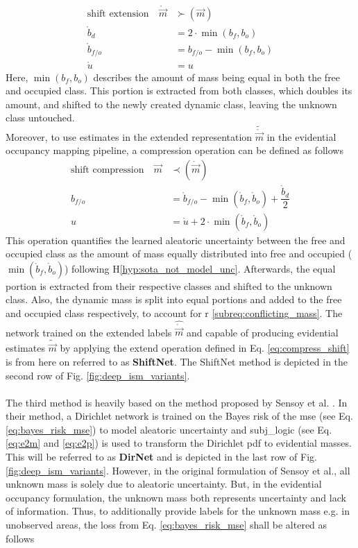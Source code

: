 \begin{align}
	\label{eq:extend_shift}
	\text{shift extension} \quad\mathring{\vec{m}} &\succ(\vec{m})\\
	\mathring{b}_d &= 2\cdot \min(b_f,b_o)\\
	\mathring{b}_{f/o} &= b_{f/o} - \min(b_f,b_o)\\
	\mathring{u} &= u
\end{align}
Here, $\min(b_f,b_o)$ describes the amount of mass being equal in both the free and occupied class. This portion is extracted from both classes, which doubles its amount, and shifted to the newly created dynamic class, leaving the unknown class untouched.\\ 
Moreover, to use estimates in the extended representation $\tilde{\mathring{\vec{m}}}$ in the evidential occupancy mapping pipeline, a compression operation can be defined as follows
\begin{align}
	\label{eq:compress_shift}
	\text{shift compression} \quad\vec{m} &\prec(\mathring{\vec{m}})\\
	b_{f/o} &= \mathring{b}_{f/o} - \min(\mathring{b}_f,\mathring{b}_o) + \dfrac{\mathring{b}_d}{2}\\
	u &= \mathring{u} + 2\cdot\min(\mathring{b}_f,\mathring{b}_o)
\end{align}
This operation quantifies the learned aleatoric uncertainty between the free and occupied class as the amount of mass equally distributed into free and occupied ($\min(\mathring{b}_f,\mathring{b}_o)$) following H\ref{hyp:sota_not_model_unc}. Afterwards, the equal portion is extracted from their respective classes and shifted to the unknown class. Also, the dynamic mass is split into equal portions and added to the free and occupied class respectively, to account for \gls{r} \ref{subreq:conflicting_mass}. The network trained on the extended labels $\hat{\mathring{\vec{m}}}$ and capable of producing evidential estimates $\tilde{\vec{m}}$ by applying the extend operation defined in Eq. \ref{eq:compress_shift} is from here on referred to as \textbf{ShiftNet}. The ShiftNet method is depicted in the second row of Fig. \ref{fig:deep_ism_variants}.
\\\\
The third method is heavily based on the method proposed by Sensoy et al. \cite{sensoy2018evidential}. In their method, a Dirichlet network is trained on the Bayes risk of the \gls{mse} (see Eq. \ref{eq:bayes_risk_mse}) to model aleatoric uncertainty and \gls{subj_logic} (see Eq. \ref{eq:e2m} and \ref{eq:e2p}) is used to transform the Dirichlet \gls{pdf} to evidential masses. This will be referred to as \textbf{DirNet} and is depicted in the last row of Fig. \ref{fig:deep_ism_variants}. However, in the original formulation of Sensoy et al., all unknown mass is solely due to aleatoric uncertainty. But, in the evidential occupancy formulation, the unknown mass both represents uncertainty and lack of information. Thus, to additionally provide labels for the unknown mass e.g. in unobserved areas, the loss from Eq. \ref{eq:bayes_risk_mse} shall be altered as follows
